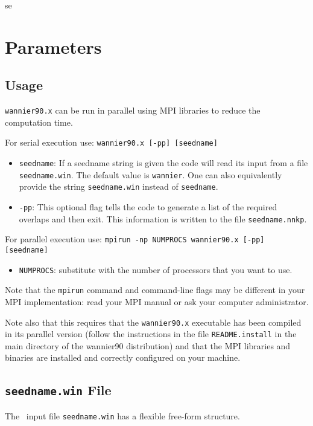 se%
\chapter{Parameters}\label{chap:parameters}

\section{Usage}
{\tt wannier90.x} can be run in parallel using MPI libraries to
reduce the computation time.

For serial execution use: {\tt wannier90.x [-pp] [seedname]}

\begin{itemize}
\item{ {\tt seedname}: If a seedname string is given the code will read its input
from a file {\tt seedname.win}. The default value is {\tt wannier}. One can also equivalently provide the string
  {\tt seedname.win} instead of  {\tt seedname}.}
\item { {\tt -pp}: This optional flag tells the code to generate
a list of the required overlaps and then exit.
This information is written to the file {\tt seedname.nnkp}.}
\end{itemize}

For parallel execution use: {\tt mpirun -np NUMPROCS wannier90.x [-pp] [seedname]}

\begin{itemize} \item
{\tt NUMPROCS}: substitute with the number of processors that you want
to use.
\end{itemize}

Note that the {\tt mpirun} command and command-line flags may be
different in your MPI implementation: read your MPI manual or ask your
computer administrator.

Note also that this requires that the {\tt wannier90.x} executable has been
compiled in its parallel version (follow the instructions in the file
{\tt README.install} in the main directory of the wannier90
distribution) and
that the MPI libraries and binaries are installed and correctly
configured on your machine.


\section{{\tt seedname.win} File\label{sec:seednamefile}}
The \wannier\ input file {\tt seedname.win} has a flexible free-form
structure.


